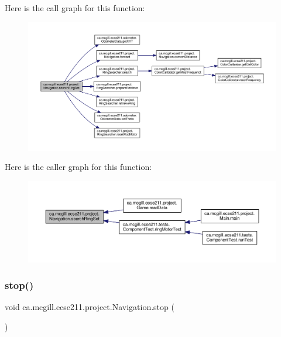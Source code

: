Here is the call graph for this function\+:
\nopagebreak
\begin{figure}[H]
\begin{center}
\leavevmode
\includegraphics[width=350pt]{classca_1_1mcgill_1_1ecse211_1_1project_1_1_navigation_a1a808e665b8dd5b8e79b0580724d239c_cgraph}
\end{center}
\end{figure}
Here is the caller graph for this function\+:
\nopagebreak
\begin{figure}[H]
\begin{center}
\leavevmode
\includegraphics[width=350pt]{classca_1_1mcgill_1_1ecse211_1_1project_1_1_navigation_a1a808e665b8dd5b8e79b0580724d239c_icgraph}
\end{center}
\end{figure}
\mbox{\label{classca_1_1mcgill_1_1ecse211_1_1project_1_1_navigation_ae8530d181ffd790ff9dea5eeab54b1a1}} 
\subsubsection{\texorpdfstring{stop()}{stop()}}
{\footnotesize\ttfamily void ca.\+mcgill.\+ecse211.\+project.\+Navigation.\+stop (\begin{DoxyParamCaption}{ }\end{DoxyParamCaption})}

